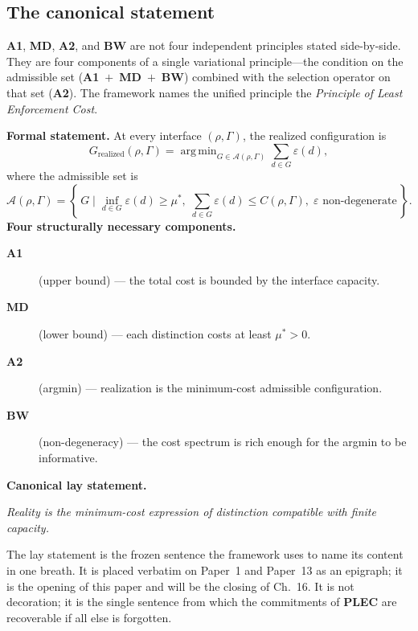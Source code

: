 \documentclass[11pt]{article}
\newcommand{\Aone}{\textbf{A1}}
\newcommand{\PLEC}{\textbf{PLEC}}
\newcommand{\argmin}{\mathop{\mathrm{arg\,min}}}
\begin{document}
\subsection{The canonical statement}\label{sec:PLEC_canonical}

\Aone{}, \textbf{MD}, \textbf{A2}, and \textbf{BW} are not four independent principles stated side-by-side. They are four components of a single variational principle---the condition on the admissible set (\Aone{}~$+$~\textbf{MD}~$+$~\textbf{BW}) combined with the selection operator on that set (\textbf{A2}). The framework names the unified principle the \emph{Principle of Least Enforcement Cost}.

\begin{tcolorbox}[apfbox, title={The Principle of Least Enforcement Cost (PLEC)}]
\textbf{Formal statement.} At every interface $(\rho, \Gamma)$, the realized configuration is
\[
G_{\mathrm{realized}}(\rho, \Gamma) = \argmin_{G \in \mathcal{A}(\rho, \Gamma)} \sum_{d \in G} \varepsilon(d),
\]
where the admissible set is
\[
\mathcal{A}(\rho, \Gamma) = \left\{\, G \;\Big|\; \inf_{d \in G} \varepsilon(d) \geq \mu^*,\; \sum_{d \in G} \varepsilon(d) \leq C(\rho, \Gamma),\; \varepsilon \text{ non-degenerate} \,\right\}.
\]
\textbf{Four structurally necessary components.}
\begin{description}
    \item[\Aone{}] (upper bound) --- the total cost is bounded by the interface capacity.
    \item[\textbf{MD}] (lower bound) --- each distinction costs at least $\mu^* > 0$.
    \item[\textbf{A2}] (argmin) --- realization is the minimum-cost admissible configuration.
    \item[\textbf{BW}] (non-degeneracy) --- the cost spectrum is rich enough for the argmin to be informative.
\end{description}
\textbf{Canonical lay statement.}
\begin{center}\itshape
Reality is the minimum-cost expression of distinction compatible with finite capacity.
\end{center}
\end{tcolorbox}

The lay statement is the frozen sentence the framework uses to name its content in one breath. It is placed verbatim on Paper~1 and Paper~13 as an epigraph; it is the opening of this paper and will be the closing of Ch.~16. It is not decoration; it is the single sentence from which the commitments of \PLEC{} are recoverable if all else is forgotten.
\end{document}
